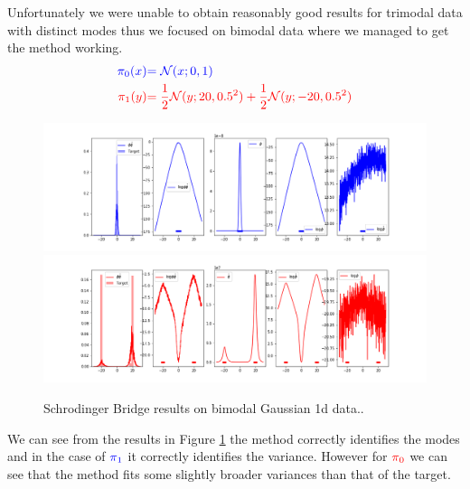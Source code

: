 \documentclass[a4paper,12pt,twoside,openright]{report}
\theoremstyle{definition}
\begin{document}
Unfortunately we were unable to obtain reasonably good results for trimodal data with distinct modes thus we focused on bimodal data where we managed to get the method working.
\begin{align*}
     \color{blue}{\pi_0(x)} &\color{blue}{= {\mathcal{N}}(x; 0,  1)} \\
    \color{red}{\pi_1(y)} &\color{red}{= \frac{1}{2}{\mathcal{N}}(y; 20, 0.5 ^2) + \frac{1}{2}{\mathcal{N}}(y; -20, 0.5 ^2)} 
\end{align*}
\begin{figure}[t]
    \centering
     \includegraphics[scale=0.45,trim={4.3cm 0.2cm 1.5cm 0}, clip]{images/Pavon/Forward_bimodal_test_working.png} \\ \vspace{-0.2cm}
    \includegraphics[scale=0.45,trim={4.3cm 0 1.5cm 1.5cm}, clip]{images/Pavon/Backward_bimodal_test_working.png} 
    \caption{Schrodinger Bridge results on bimodal Gaussian 1d data.. }
    \label{fig:pavon_bimodal}
\end{figure}
We can see from the results in  Figure \ref{fig:pavon_bimodal} the method correctly identifies the modes and in the case of $\color{blue}{\pi_1}$ it correctly identifies the variance. However for $\color{red}{\pi_0}$ we can see that the method fits some slightly broader variances than that of the target. 
\end{document}
